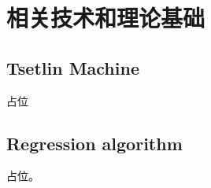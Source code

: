 
\chapter{相关技术和理论基础}

\section{Tsetlin Machine}
占位\cite{liu2019}

\section{Regression algorithm}
占位。\cite{pu2013}


